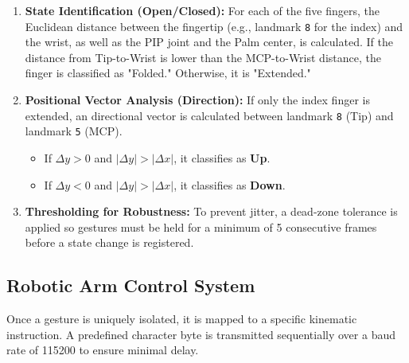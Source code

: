 \documentclass[conference]{IEEEtran}
\begin{document}
\begin{enumerate}
    \item \textbf{State Identification (Open/Closed):} For each of the five fingers, the Euclidean distance between the fingertip (e.g., landmark \texttt{8} for the index) and the wrist, as well as the PIP joint and the Palm center, is calculated. If the distance from Tip-to-Wrist is lower than the MCP-to-Wrist distance, the finger is classified as "Folded." Otherwise, it is "Extended."
    \item \textbf{Positional Vector Analysis (Direction):} If only the index finger is extended, an directional vector is calculated between landmark \texttt{8} (Tip) and landmark \texttt{5} (MCP).
    \begin{itemize}
        \item If $\Delta y > 0$ and $|\Delta y| > |\Delta x|$, it classifies as \textbf{Up}.
        \item If $\Delta y < 0$ and $|\Delta y| > |\Delta x|$, it classifies as \textbf{Down}.
    \end{itemize}
    \item \textbf{Thresholding for Robustness:} To prevent jitter, a dead-zone tolerance is applied so gestures must be held for a minimum of 5 consecutive frames before a state change is registered.
\end{enumerate}

\subsection{Robotic Arm Control System}
Once a gesture is uniquely isolated, it is mapped to a specific kinematic instruction. A predefined character byte is transmitted sequentially over a baud rate of 115200 to ensure minimal delay.
\end{document}
